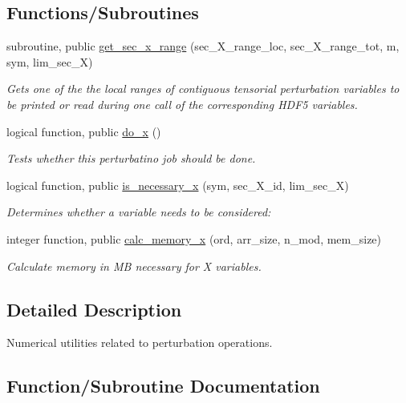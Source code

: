 \subsection*{Functions/\+Subroutines}
\begin{DoxyCompactItemize}
\item 
subroutine, public \hyperlink{namespacex__utilities_a6072ddd1fd230758795ff320c75a1f6a}{get\+\_\+sec\+\_\+x\+\_\+range} (sec\+\_\+\+X\+\_\+range\+\_\+loc, sec\+\_\+\+X\+\_\+range\+\_\+tot, m, sym, lim\+\_\+sec\+\_\+X)
\begin{DoxyCompactList}\small\item\em Gets one of the the local ranges of contiguous tensorial perturbation variables to be printed or read during one call of the corresponding H\+D\+F5 variables. \end{DoxyCompactList}\item 
logical function, public \hyperlink{namespacex__utilities_adef8eab82f0fd670a7795c754cf9a8f9}{do\+\_\+x} ()
\begin{DoxyCompactList}\small\item\em Tests whether this perturbatino job should be done. \end{DoxyCompactList}\item 
logical function, public \hyperlink{namespacex__utilities_a689aca7fedb49c43c5a65a18d557259f}{is\+\_\+necessary\+\_\+x} (sym, sec\+\_\+\+X\+\_\+id, lim\+\_\+sec\+\_\+X)
\begin{DoxyCompactList}\small\item\em Determines whether a variable needs to be considered\+: \end{DoxyCompactList}\item 
integer function, public \hyperlink{namespacex__utilities_a4d18921da77463d069346f1c7322b451}{calc\+\_\+memory\+\_\+x} (ord, arr\+\_\+size, n\+\_\+mod, mem\+\_\+size)
\begin{DoxyCompactList}\small\item\em Calculate memory in MB necessary for X variables. \end{DoxyCompactList}\end{DoxyCompactItemize}


\subsection{Detailed Description}
Numerical utilities related to perturbation operations. 

\subsection{Function/\+Subroutine Documentation}
\mbox{\label{namespacex__utilities_a4d18921da77463d069346f1c7322b451}} 
